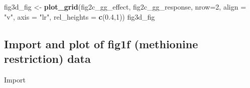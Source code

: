 \documentclass[]{book}
\newenvironment{Shaded}{\begin{snugshade}}{\end{snugshade}}
\newcommand{\DataTypeTok}[1]{\textcolor[rgb]{0.13,0.29,0.53}{#1}}
\newcommand{\DecValTok}[1]{\textcolor[rgb]{0.00,0.00,0.81}{#1}}
\newcommand{\FloatTok}[1]{\textcolor[rgb]{0.00,0.00,0.81}{#1}}
\newcommand{\KeywordTok}[1]{\textcolor[rgb]{0.13,0.29,0.53}{\textbf{#1}}}
\newcommand{\NormalTok}[1]{#1}
\newcommand{\StringTok}[1]{\textcolor[rgb]{0.31,0.60,0.02}{#1}}
\begin{document}
\begin{Shaded}
\begin{Highlighting}[]
\NormalTok{fig3d_fig <-}\StringTok{ }\KeywordTok{plot_grid}\NormalTok{(fig2c_gg_effect,}
\NormalTok{                       fig2c_gg_response,}
                       \DataTypeTok{nrow=}\DecValTok{2}\NormalTok{,}
                       \DataTypeTok{align =} \StringTok{"v"}\NormalTok{,}
                       \DataTypeTok{axis =} \StringTok{"lr"}\NormalTok{,}
                       \DataTypeTok{rel_heights =} \KeywordTok{c}\NormalTok{(}\FloatTok{0.4}\NormalTok{,}\DecValTok{1}\NormalTok{))}
\NormalTok{fig3d_fig}
\end{Highlighting}
\end{Shaded}

\hypertarget{import-and-plot-of-fig1f-methionine-restriction-data}{%
\subsection{Import and plot of fig1f (methionine restriction) data}\label{import-and-plot-of-fig1f-methionine-restriction-data}}

Import
\end{document}
